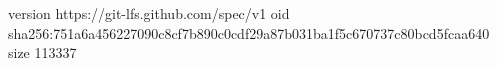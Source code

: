 version https://git-lfs.github.com/spec/v1
oid sha256:751a6a456227090c8cf7b890c0cdf29a87b031ba1f5c670737c80bcd5fcaa640
size 113337
